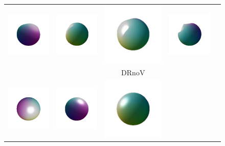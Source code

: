 \documentclass[runningheads]{llncs}
\begin{document}
\begin{figure}[t]
\begin{tabular}{ccccc}
         \includegraphics[width=0.2\columnwidth]{color/udr_minus/eval_10000_6.png} &
         \includegraphics[width=0.2\columnwidth]{color/udr_minus/eval_10000_8.png} &
         \includegraphics[width=0.2\columnwidth]{color/udr_minus/eval_10000_0.png} &
         \includegraphics[width=0.2\columnwidth]{color/udr_minus/eval_10000_7.png} \vspace{-10pt} \\ 
         & & {DRnoV} & & \\
         \includegraphics[width=0.2\columnwidth]{color/udr/eval_10000_1.png} &  
         \includegraphics[width=0.2\columnwidth]{color/udr/eval_10000_9.png} &
         \includegraphics[width=0.2\columnwidth]{color/udr/eval_10000_0.png} &

\end{tabular}
\end{figure}
\end{document}
